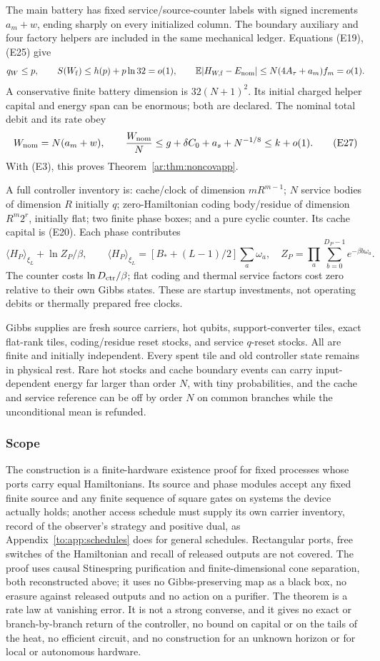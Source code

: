 The main battery has fixed service/source-counter labels with signed
increments \(a_m+w\), ending sharply on every initialized column.
The boundary auxiliary and four factory helpers are included in
the same mechanical ledger. Equations (E19), (E25) give
\[
 q_W\le p,\qquad S(W_{\rm f})\le h(p)+p\ln32=o(1),\qquad
 \mathbb E|H_{W,\rm f}-E_{\rm nom}|\le N(4A_\tau+a_m) f_m=o(1).
\]
A conservative finite battery dimension is \(32(N+1)^2\).
Its initial charged helper capital and energy span can be enormous;
both are declared. The nominal total debit and its rate obey
\[
 W_{\rm nom}=N(a_m+w),\qquad
 \frac{W_{\rm nom}}N
 \le g+\delta C_0+a_s+N^{-1/8}\le k+o(1).           \tag{E27}
\]
With (E3), this proves Theorem~\ref{ar:thm:noncovapp}.

A full controller inventory is: cache/clock of dimension \(mR^{m-1}\);
\(N\) service bodies of dimension \(R\) initially \(q\);
zero-Hamiltonian coding body/residue of dimension \(R^m2^r\), initially flat;
two finite phase boxes; and a pure cyclic counter.
Its cache capital is (E20). Each phase contributes
\[
 \langle H_P\rangle_{\xi_L}+\ln Z_P/\beta,\qquad
 \langle H_P\rangle_{\xi_L}
 =[B_*+(L-1)/2]\sum_a\omega_a,\quad
 Z_P=\prod_a\sum_{b=0}^{D_P-1}e^{-\beta b\omega_a}.
\]
The counter costs \(\ln D_{\rm ctr}/\beta\); flat coding and thermal
service factors cost zero relative to their own Gibbs states.
These are startup investments, not operating debits or thermally
prepared free clocks.

Gibbs supplies are fresh source carriers, hot qubits, support-converter
tiles, exact flat-rank tiles, coding/residue reset stocks, and service
\(q\)-reset stocks. All are finite and initially independent.
Every spent tile and old controller state remains in physical rest.
Rare hot stocks and cache boundary events can carry input-dependent energy far larger than order $N$, with tiny probabilities, and the cache and service reference can be off by order \(N\) on common
branches while the unconditional mean is refunded.

\subsubsection{Scope}
The construction is a finite-hardware existence proof for fixed processes whose ports carry equal Hamiltonians. Its source and phase modules accept any fixed finite source and any finite sequence of square gates on systems the device actually holds; another access schedule must supply its own carrier inventory, record of the observer's strategy and positive dual, as Appendix~\ref{to:app:schedules} does for general schedules. Rectangular ports, free switches of the Hamiltonian and recall of released outputs are not covered. The proof uses causal Stinespring purification and finite-dimensional cone separation, both reconstructed above; it uses no Gibbs-preserving map as a black box, no erasure against released outputs and no action on a purifier. The theorem is a rate law at vanishing error. It is not a strong converse, and it gives no exact or branch-by-branch return of the controller, no bound on capital or on the tails of the heat, no efficient circuit, and no construction for an unknown horizon or for local or autonomous hardware.

